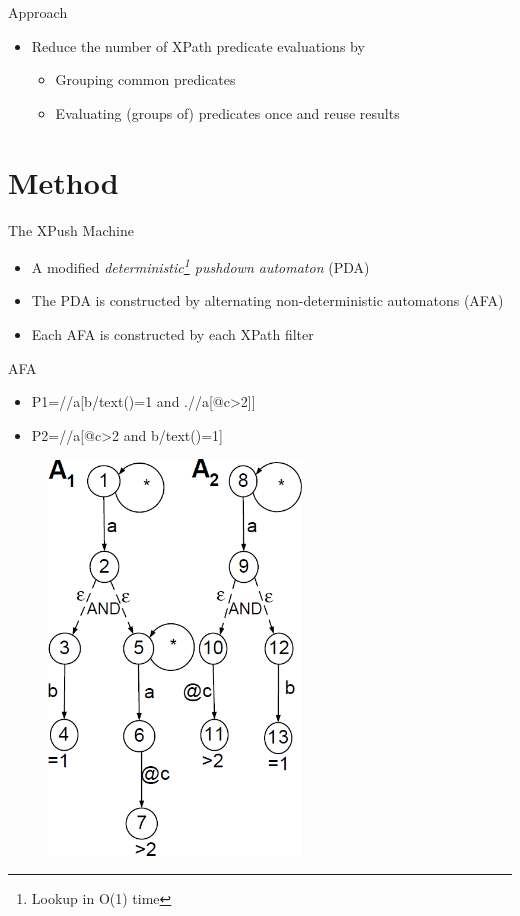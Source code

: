 \documentclass[mathserif,serif]{beamer}
\begin{document}
\begin{frame}{Approach}
  \begin{itemize}
    \item Reduce the number of XPath predicate evaluations by
    \begin{itemize}
      \item Grouping common predicates 
      \item Evaluating (groups of) predicates once and reuse results
    \end{itemize}
  \end{itemize}
\end{frame}

\section{Method}
\begin{frame}{The XPush Machine}
  \begin{itemize}
    \item A modified \emph{deterministic\footnote{Lookup in O(1) time} pushdown automaton} (PDA)
    \item The PDA is constructed by alternating non-deterministic automatons (AFA)
    \item Each AFA is constructed by each XPath filter
  \end{itemize}
\end{frame}


\begin{frame}{AFA}
  \begin{itemize}
    \item P1=//a[b/text()=1 and .//a[@c>2]]
    \item P2=//a[@c>2 and b/text()=1]
  \end{itemize}
  \begin{figure}
    \centering
    \includegraphics[width=0.6\textwidth]{AFA.png}
  \end{figure}
\end{frame}
\end{document}
